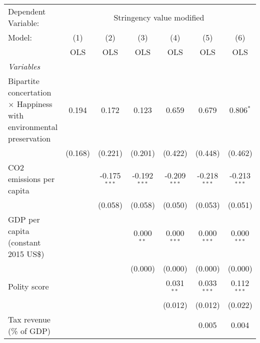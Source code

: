
\begingroup
\centering
\begin{tabular}{lcccccc}
   \toprule
   Dependent Variable: & \multicolumn{6}{c}{Stringency value modified}\\
   Model:                                                                     & (1)     & (2)            & (3)            & (4)            & (5)            & (6)\\  
                                                                              &  OLS    & OLS            & OLS            & OLS            & OLS            & OLS\\  
   \midrule
   \emph{Variables}\\
   Bipartite concertation $\times$ Happiness with environmental preservation  & 0.194   & 0.172          & 0.123          & 0.659          & 0.679          & 0.806$^{*}$\\   
                                                                              & (0.168) & (0.221)        & (0.201)        & (0.422)        & (0.448)        & (0.462)\\   
   CO2 emissions per capita                                                   &         & -0.175$^{***}$ & -0.192$^{***}$ & -0.209$^{***}$ & -0.218$^{***}$ & -0.213$^{***}$\\   
                                                                              &         & (0.058)        & (0.058)        & (0.050)        & (0.053)        & (0.051)\\   
   GDP per capita (constant 2015 US\$)                                        &         &                & 0.000$^{**}$   & 0.000$^{***}$  & 0.000$^{***}$  & 0.000$^{***}$\\   
                                                                              &         &                & (0.000)        & (0.000)        & (0.000)        & (0.000)\\   
   Polity score                                                               &         &                &                & 0.031$^{**}$   & 0.033$^{***}$  & 0.112$^{***}$\\   
                                                                              &         &                &                & (0.012)        & (0.012)        & (0.022)\\   
   Tax revenue (\% of GDP)                                                    &         &                &                &                & 0.005          & 0.004\\   

\end{tabular}
